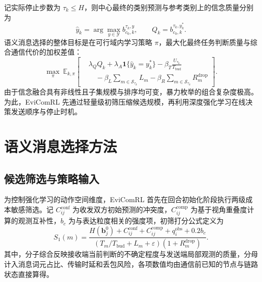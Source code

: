 记实际停止步数为 $\tau_k\leq H$，则中心最终的类别预测与参考类别上的信念质量分别为
\begin{equation}
\hat y_k=\arg\max_{y\in\mathcal Y} b_{c_0,k}^{\tau_k,y},\qquad
Q_k= b_{c_0,k}^{\tau_k,y_k^*}.
\label{rq2:eq:quality}
\end{equation}
语义消息选择的整体目标是在可行域内学习策略 $\pi$，最大化最终任务判断质量与综合通信代价的加权差值：
\begin{equation}
\max_{\pi}\ \mathbb E_{k,\pi}\!\left[
\begin{aligned}
&\lambda_Q Q_k+\lambda_A\mathbf1\{\hat y_k=y_k^*\}
-\beta_T\frac{U_{\tau_k}}{T_{\mathrm{bud}}}\\
&\hspace{1em}-\beta_L\sum_{m\in\mathcal S_{\tau_k}}L_m
-\beta_R\sum_{m\in\mathcal S_{\tau_k}}R_m^{\mathrm{drop}}
\end{aligned}\right].
\label{rq2:eq:objective}
\end{equation}
由于信念融合具有非线性且子集规模与排序均可变，暴力枚举的组合复杂度极高。为此，EviComRL 先通过轻量级初筛压缩候选规模，再利用深度强化学习在线决策发送顺序与停止时机。

\section{语义消息选择方法}
\label{rq2:sec:algorithm}

\subsection{候选筛选与策略输入}

为控制强化学习的动作空间维度，EviComRL 首先在回合初始化阶段执行两级成本敏感筛选。记 $C_{ij}^{\mathrm{conf}}$ 为收发双方初始预测的冲突度，$C_{ij}^{\mathrm{comp}}$ 为基于视角重叠度计算的观测互补性，$b_c$ 为与表达粒度相关的强度项，初筛打分公式定义为
\begin{equation}
S_1(m)=\frac{H(\bm b_j^0)+C_{ij}^{\mathrm{conf}}+C_{ij}^{\mathrm{comp}}+q_i^{\mathrm{obs}}+0.2b_c}
{(T_m/T_{\mathrm{bud}}+L_m+\varepsilon)(1+R_m^{\mathrm{drop}})}.
\label{rq2:eq:retrieval}
\end{equation}
其中，分子综合反映接收端当前判断的不确定程度与发送端局部观测的质量，分母计入消息词元占比、传输时延和丢包风险，各项数值均由通信前已知的节点与链路状态直接算得。

